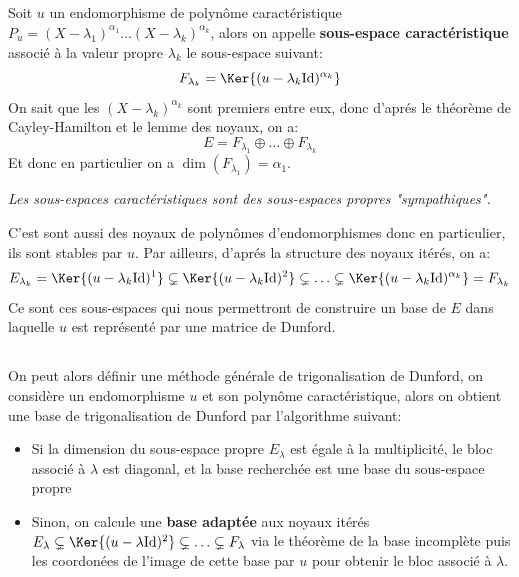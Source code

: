 \subsection*{}
Soit \(u\) un endomorphisme de polynôme caractéristique \(P_u = (X - \lambda_1)^{\alpha_1}\ldots(X - \lambda_k)^{\alpha_k}\), alors on appelle \textbf{sous-espace caractéristique} associé à la valeur propre \(\lambda_k\) le sous-espace suivant:
\[
   F_{\lambda_k} = \Ker{(u - \lambda_k\text{Id})^{\alpha_k}}   
\]
On sait que les \((X - \lambda_k)^{\alpha_k}\) sont premiers entre eux, donc d'aprés le théorème de Cayley-Hamilton et le lemme des noyaux, on a:
\[
   E = F_{\lambda_1} \oplus \ldots \oplus F_{\lambda_k}
\]
Et donc en particulier on a \(\dim(F_{\lambda_1}) = \alpha_1\).
\begin{center}
   \textit{Les sous-espaces caractéristiques sont des sous-espaces propres "sympathiques".}
\end{center}
C'est sont aussi des noyaux de polynômes d'endomorphismes donc en particulier, ils sont stables par \(u\). Par ailleurs, d'aprés la structure des noyaux itérés, on a:
\[
   E_{\lambda_k} = \Ker{(u - \lambda_k\text{Id})^1} \subsetneq \Ker{(u - \lambda_k\text{Id})^2} \subsetneq \ldots \subsetneq \Ker{(u - \lambda_k\text{Id})^{\alpha_k}} = F_{\lambda_k}
\]
Ce sont ces sous-espaces qui nous permettront de construire un base de \(E\) dans laquelle \(u\) est représenté par une matrice de Dunford.
\subsection*{}
On peut alors définir une méthode générale de trigonalisation de Dunford, on considère un endomorphisme \(u\) et son polynôme caractéristique, alors on obtient une base de trigonalisation de Dunford par l'algorithme suivant:
\begin{itemize}
   \item Si la dimension du sous-espace propre \(E_\lambda\) est égale à la multiplicité, le bloc associé à \(\lambda\) est diagonal, et la base recherchée est une base du sous-espace propre
   \item Sinon, on calcule une \textbf{base adaptée} aux noyaux itérés \(E_\lambda \subsetneq \Ker{(u - \lambda\text{Id})^2} \subsetneq \ldots \subsetneq F_\lambda\) via le théorème de la base incomplète puis les coordonées de l'image de cette base par \(u\) pour obtenir le bloc associé à \(\lambda\).
\end{itemize}

